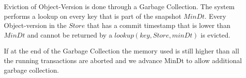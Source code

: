\documentclass[systeme,french,english]{compas2022}
\begin{document}
Eviction of Object-Version is done through a Garbage Collection.
The system performs a lookup on every key that is part of the snapshot $\mathit{MinDt}$.
Every Object-version in the $\mathit{Store}$ that has a commit timestamp that is lower than $\mathit{MinDt}$ and cannot be returned by a $\mathit{lookup(key,Store,minDt)}$ is evicted.

If at the end of the Garbage Collection the memory used is still higher than all the running transactions are aborted and we advance MinDt to allow additional garbage collection.




\end{document}
